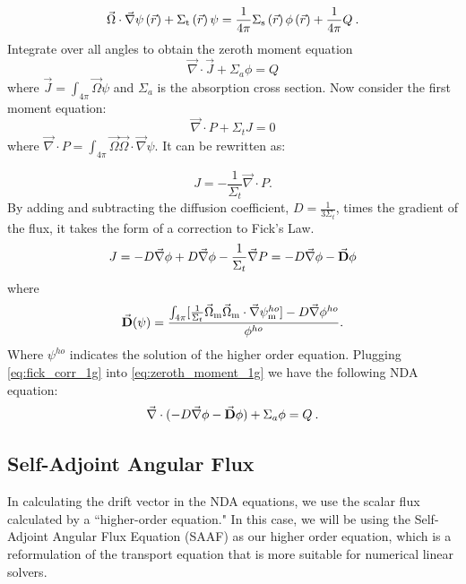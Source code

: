   \begin{equation}
  \vec{\Omega}\cdot \vec{\nabla} \psi \left(\vec{r}\right)+ \Sigma_{\mathrm{t}}\left(\vec{r}\right)\psi = \frac{1}{4 \pi} \Sigma_{\mathrm{s}}\left(\vec{r}\right) \phi\left(\vec{r}\right) + \frac{1}{4 \pi} Q\:.
  \end{equation}
Integrate over all angles to obtain the zeroth moment equation
\begin{equation}
  \vec{\nabla} \cdot \vec{J} + \Sigma_a\phi  =  Q
  \label{eq:zeroth_moment_1g}
  \end{equation}
where $\vec{J} = \int_{4\pi} \vec{\Omega}\psi$ and $\Sigma_a$ is the absorption cross section.   Now consider the first moment equation:
  \begin{equation}
  \vec{\nabla} \cdot P + \Sigma_t J = 0
  \end{equation}
where $\vec{\nabla} \cdot P =  \int_{4\pi} \vec{\Omega} \vec{\Omega} \cdot \vec{\nabla} \psi$. It can be rewritten as: 

  \begin{equation}
  J= -\frac{1}{\Sigma_t} \vec{\nabla} \cdot P. 
  \end{equation}
  By adding and subtracting the diffusion coefficient, $D = \frac{1}{3\Sigma_t}$, times the gradient of the flux, it takes the form of a correction to Fick's Law. 
  \begin{equation}
  J = -D \vec{\nabla} \phi + D \vec{\nabla} \phi - \frac{1}{\Sigma_t} \vec{\nabla} P \\
  = -D \vec{\nabla} \phi - \vec{\textbf{D}} \phi
  \label{eq:fick_corr_1g}
  \end{equation}
  where 
 \begin{equation}
  \vec{\textbf{D}} (\psi) = \frac{\int_{4\pi} [\frac{1}{\Sigma_t} \vec{\Omega}_{\mathrm{m}} \vec{\Omega}_{\mathrm{m}} \cdot \vec{\nabla}\psi^{ho}_{\mathrm{m}}] - D \vec{\nabla} \phi^{ho}}{\phi^{ho}}.
  \label{eq:drift_vector}
  \end{equation} 
Where $\psi^{ho}$ indicates the solution of the higher order equation. Plugging \eqref{eq:fick_corr_1g} into \eqref{eq:zeroth_moment_1g} we have the following NDA equation:
  \begin{equation}
  \vec{\nabla}\cdot(-D \vec{\nabla} \phi - \vec{\bf D} \phi) + \Sigma_a \phi = Q \:. \label{eq:NDA_1g}
  \end{equation}
  
 
\subsection{Self-Adjoint Angular Flux}
In calculating the drift vector in the NDA equations, we use the scalar flux calculated by a ``higher-order equation." In this case, we will be using the Self-Adjoint Angular Flux Equation (SAAF) \cite{saaf} as our higher order equation, which is a reformulation of the transport equation that is more suitable for numerical linear solvers. 

